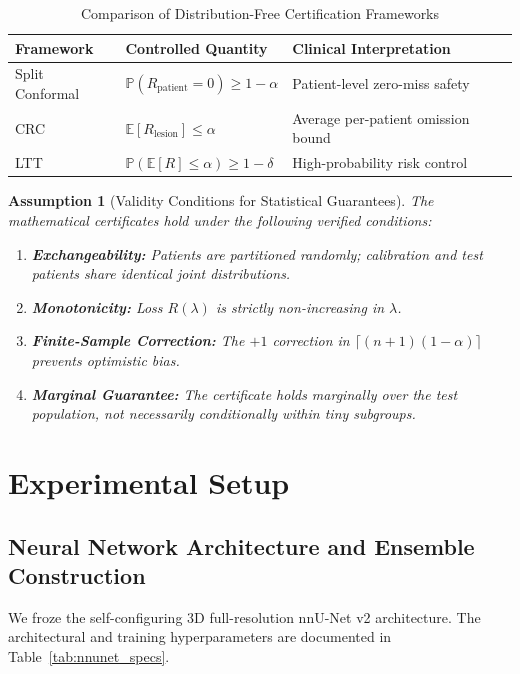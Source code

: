 \documentclass[journal,10pt,twocolumn]{IEEEtran}
\newtheorem{assumption}{Assumption}
\begin{document}
\begin{table}[h]
\centering
\caption{Comparison of Distribution-Free Certification Frameworks}
\label{tab:guarantees_comp}
\begin{tabular}{lll}
\toprule
\textbf{Framework} & \textbf{Controlled Quantity} & \textbf{Clinical Interpretation} \\
\midrule
Split Conformal & $\mathbb{P}\left(R_{\mathrm{patient}} = 0\right) \ge 1 - \alpha$ & Patient-level zero-miss safety \\
CRC \cite{Angelopoulos2022crc} & $\mathbb{E}\left[R_{\mathrm{lesion}}\right] \le \alpha$ & Average per-patient omission bound \\
LTT \cite{Angelopoulos2022crc} & $\mathbb{P}\left(\mathbb{E}[R] \le \alpha\right) \ge 1 - \delta$ & High-probability risk control \\
\bottomrule
\end{tabular}
\end{table}

\begin{assumption}[Validity Conditions for Statistical Guarantees]
The mathematical certificates hold under the following verified conditions:
\begin{enumerate}
    \item \textbf{Exchangeability:} Patients are partitioned randomly; calibration and test patients share identical joint distributions.
    \item \textbf{Monotonicity:} Loss $R(\lambda)$ is strictly non-increasing in $\lambda$.
    \item \textbf{Finite-Sample Correction:} The $+1$ correction in $\lceil (n+1)(1-\alpha) \rceil$ prevents optimistic bias.
    \item \textbf{Marginal Guarantee:} The certificate holds marginally over the test population, not necessarily conditionally within tiny subgroups.
\end{enumerate}
\end{assumption}

\section{Experimental Setup}

\subsection{Neural Network Architecture and Ensemble Construction}
We froze the self-configuring 3D full-resolution nnU-Net v2 architecture. The architectural and training hyperparameters are documented in Table~\ref{tab:nnunet_specs}.
\end{document}
